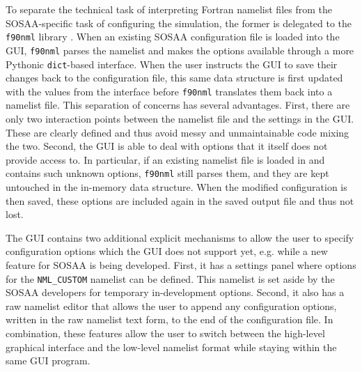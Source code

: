 \newpar To separate the technical task of interpreting Fortran namelist files from the SOSAA-specific task of configuring the simulation, the former is delegated to the \texttt{f90nml} library \cite{f90nml-1.4}. When an existing SOSAA configuration file is loaded into the GUI, \texttt{f90nml} parses the namelist and makes the options available through a more Pythonic \texttt{dict}-based interface. When the user instructs the GUI to save their changes back to the configuration file, this same data structure is first updated with the values from the interface before \texttt{f90nml} translates them back into a namelist file. This separation of concerns has several advantages. First, there are only two interaction points between the namelist file and the settings in the GUI. These are clearly defined and thus avoid messy and unmaintainable code mixing the two. Second, the GUI is able to deal with options that it itself does not provide access to. In particular, if an existing namelist file is loaded in and contains such unknown options, \texttt{f90nml} still parses them, and they are kept untouched in the in-memory data structure. When the modified configuration is then saved, these options are included again in the saved output file and thus not lost.

The GUI contains two additional explicit mechanisms to allow the user to specify configuration options which the GUI does not support yet, e.g. while a new feature for SOSAA is being developed. First, it has a settings panel where options for the \texttt{NML\_CUSTOM} namelist can be defined. This namelist is set aside by the SOSAA developers for temporary in-development options. Second, it also has a raw namelist editor that allows the user to append any configuration options, written in the raw namelist text form, to the end of the configuration file. In combination, these features allow the user to switch between the high-level graphical interface and the low-level namelist format while staying within the same GUI program.

